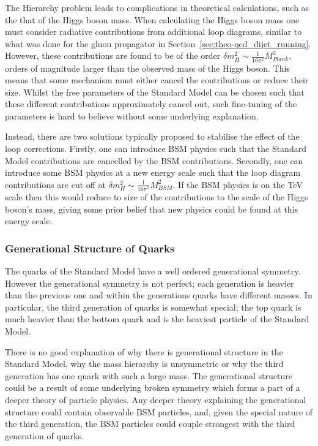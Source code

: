 The Hierarchy problem leads to complications in theoretical calculations, such as the that of the Higgs boson mass.
When calculating the Higgs boson mass one must consider
radiative contributions from additional loop diagrams,
similar to what was done for the gluon propagator in Section~\ref{sec:theo-qcd_dijet_running}.
However, these contributions are found to be of the order $\delta m_H^2 \sim \frac{1}{16\pi^2} M_{Plank}^2$\hspace{0.2mm},
orders of magnitude larger than the observed mass of the Higgs boson.
This means that some mechanism must either cancel the contributions or reduce their size.
Whilst the free parameters of the Standard Model can be chosen such that these different contributions approximately cancel out,
such fine-tuning of the parameters is hard to believe without some underlying explanation.

Instead, there are two solutions typically proposed to stabilise the effect of the loop corrections.
Firstly, one can introduce BSM physics such that the Standard Model contributions are cancelled by the BSM contributions.
Secondly, one can introduce some BSM physics at a new energy scale
such that the loop diagram contributions are cut off at $\delta m_H^2 \sim \frac{1}{16\pi^2} M_{BSM}^2$.
If the BSM physics is on the TeV scale then this would reduce to size of the contributions to the scale of the Higgs boson's mass,
giving some prior belief that new physics could be found at this energy scale.

\subsubsection{Generational Structure of Quarks}
\label{sec:theo-bsm_3g}

The quarks of the Standard Model have a well ordered generational symmetry.
However the generational symmetry is not perfect;
each generation is heavier than the previous one
and within the generations quarks have different masses.
In particular, the third generation of quarks is somewhat special;
the top quark is much heavier than the bottom quark
and is the heaviest particle of the Standard Model.

There is no good explanation of why there is generational structure in the Standard Model,
why the mass hierarchy is unsymmetric 
or why the third generation has one quark with such a large mass.
The generational structure could be a result of some underlying broken symmetry
which forms a part of a deeper theory of particle physics.
Any deeper theory explaining the generational structure could contain observable BSM particles,
and, given the special nature of the third generation,
the BSM particles could couple strongest with the third generation of quarks.

